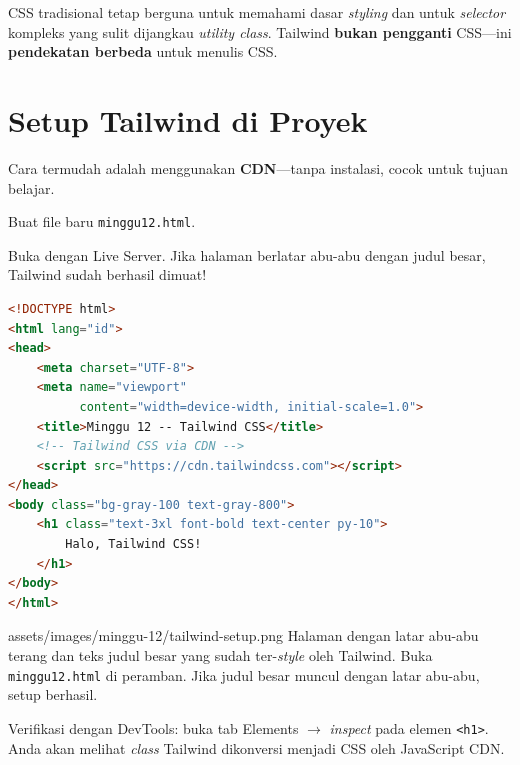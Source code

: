 \begin{catatan}
CSS tradisional tetap berguna untuk memahami dasar \emph{styling} dan untuk \emph{selector} kompleks yang sulit dijangkau \emph{utility class}. Tailwind \textbf{bukan pengganti} CSS---ini \textbf{pendekatan berbeda} untuk menulis CSS.
\end{catatan}

\section{Setup Tailwind di Proyek}
\label{sec:12-setup}

Cara termudah adalah menggunakan \textbf{CDN}---tanpa instalasi, cocok untuk tujuan belajar.

\begin{langkah}
  \item Buat file baru \texttt{minggu12.html}.
  \item Buka dengan Live Server. Jika halaman berlatar abu-abu dengan judul besar, Tailwind sudah berhasil dimuat!
\end{langkah}

\begin{lstlisting}[language=HTML, caption={Setup Tailwind CSS via CDN}, label={lst:12-setup}]
<!DOCTYPE html>
<html lang="id">
<head>
    <meta charset="UTF-8">
    <meta name="viewport"
          content="width=device-width, initial-scale=1.0">
    <title>Minggu 12 -- Tailwind CSS</title>
    <!-- Tailwind CSS via CDN -->
    <script src="https://cdn.tailwindcss.com"></script>
</head>
<body class="bg-gray-100 text-gray-800">
    <h1 class="text-3xl font-bold text-center py-10">
        Halo, Tailwind CSS!
    </h1>
</body>
</html>
\end{lstlisting}

\begin{tangkapanlayar}
  {assets/images/minggu-12/tailwind-setup.png}
  {Halaman dengan latar abu-abu terang dan teks judul besar yang sudah ter-\emph{style} oleh Tailwind.}
  {Buka \texttt{minggu12.html} di peramban. Jika judul besar muncul dengan latar abu-abu, setup berhasil.}
\end{tangkapanlayar}

\begin{tip}
Verifikasi dengan DevTools: buka tab Elements $\rightarrow$ \emph{inspect} pada elemen \texttt{<h1>}. Anda akan melihat \emph{class} Tailwind dikonversi menjadi CSS oleh JavaScript CDN.
\end{tip}

